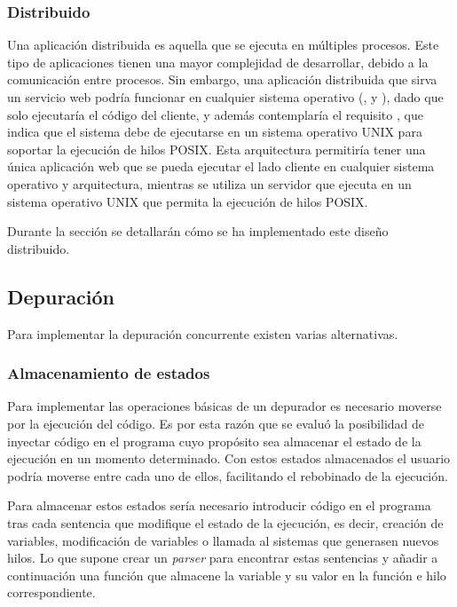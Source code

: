 \subsubsection{Distribuido} \label{subsubsec:distribuido}

Una \gls{aplicación distribuida} es aquella que se ejecuta en múltiples procesos. Este tipo de aplicaciones tienen una mayor complejidad de desarrollar, debido a la comunicación entre procesos. Sin embargo, una \gls{aplicación distribuida} que sirva un \gls{servicio web} podría funcionar en cualquier sistema operativo (,  y ), dado que solo ejecutaría el código del cliente, y además contemplaría el requisito , que indica que el sistema debe de ejecutarse en un sistema operativo UNIX para soportar la ejecución de \glspl{hilo} POSIX. Esta arquitectura permitiría tener una única \gls{aplicación web} que se pueda ejecutar el lado cliente en cualquier sistema operativo y arquitectura, mientras se utiliza un servidor que ejecuta en un sistema operativo UNIX que permita la ejecución de \glspl{hilo} POSIX.

Durante la sección  se detallarán cómo se ha implementado este diseño distribuido. 

\subsection{Depuración} \label{subsec:depuracion}

Para implementar la depuración concurrente existen varias alternativas. 

\subsubsection{Almacenamiento de estados} \label{subsec:almacenamiento-estados}

Para implementar las operaciones básicas de un depurador es necesario moverse por la ejecución del código. Es por esta razón que se evaluó la posibilidad de \gls{inyectar código} en el programa cuyo propósito sea almacenar el estado de la ejecución en un momento determinado. Con estos estados almacenados el usuario podría moverse entre cada uno de ellos, facilitando el rebobinado de la ejecución.

Para almacenar estos estados sería necesario introducir código en el programa tras cada \gls{sentencia} que modifique el estado de la ejecución, es decir, creación de variables, modificación de variables o \glspl{llamada al sistema} que generasen nuevos \glspl{hilo}. Lo que supone crear un \textit{\gls{parser}} para encontrar estas \glspl{sentencia} y añadir a continuación una función que almacene la variable y su valor en la función e \gls{hilo} correspondiente. 

